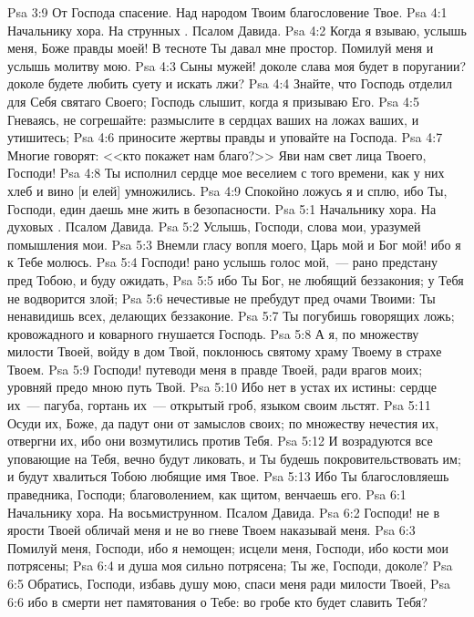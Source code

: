 \vs Psa 3:9 От Господа спасение. Над народом Твоим благословение Твое.
\vs Psa 4:1 Начальнику хора. На струнных . Псалом Давида.
\rsbpar\vs Psa 4:2 Когда я взываю, услышь меня, Боже правды моей! В тесноте Ты давал мне простор. Помилуй меня и услышь молитву мою.
\vs Psa 4:3 Сыны мужей! доколе слава моя будет в поругании? доколе будете любить суету и искать лжи?
\vs Psa 4:4 Знайте, что Господь отделил для Себя святаго Своего; Господь слышит, когда я призываю Его.
\vs Psa 4:5 Гневаясь, не согрешайте: размыслите в сердцах ваших на ложах ваших, и утишитесь;
\vs Psa 4:6 приносите жертвы правды и уповайте на Господа.
\vs Psa 4:7 Многие говорят: <<кто покажет нам благо?>> Яви нам свет лица Твоего, Господи!
\vs Psa 4:8 Ты исполнил сердце мое веселием с того времени, как у них хлеб и вино [и елей] умножились.
\vs Psa 4:9 Спокойно ложусь я и сплю, ибо Ты, Господи, един даешь мне жить в безопасности.
\vs Psa 5:1 Начальнику хора. На духовых . Псалом Давида.
\rsbpar\vs Psa 5:2 Услышь, Господи, слова мои, уразумей помышления мои.
\vs Psa 5:3 Внемли гласу вопля моего, Царь мой и Бог мой! ибо я к Тебе молюсь.
\vs Psa 5:4 Господи! рано услышь голос мой,~--- рано предстану пред Тобою, и буду ожидать,
\vs Psa 5:5 ибо Ты Бог, не любящий беззакония; у Тебя не водворится злой;
\vs Psa 5:6 нечестивые не пребудут пред очами Твоими: Ты ненавидишь всех, делающих беззаконие.
\vs Psa 5:7 Ты погубишь говорящих ложь; кровожадного и коварного гнушается Господь.
\vs Psa 5:8 А я, по множеству милости Твоей, войду в дом Твой, поклонюсь святому храму Твоему в страхе Твоем.
\vs Psa 5:9 Господи! путеводи меня в правде Твоей, ради врагов моих; уровняй предо мною путь Твой.
\vs Psa 5:10 Ибо нет в устах их истины: сердце их~--- пагуба, гортань их~--- открытый гроб, языком своим льстят.
\vs Psa 5:11 Осуди их, Боже, да падут они от замыслов своих; по множеству нечестия их, отвергни их, ибо они возмутились против Тебя.
\vs Psa 5:12 И возрадуются все уповающие на Тебя, вечно будут ликовать, и Ты будешь покровительствовать им; и будут хвалиться Тобою любящие имя Твое.
\vs Psa 5:13 Ибо Ты благословляешь праведника, Господи; благоволением, как щитом, венчаешь его.
\vs Psa 6:1 Начальнику хора. На восьмиструнном. Псалом Давида.
\rsbpar\vs Psa 6:2 Господи! не в ярости Твоей обличай меня и не во гневе Твоем наказывай меня.
\vs Psa 6:3 Помилуй меня, Господи, ибо я немощен; исцели меня, Господи, ибо кости мои потрясены;
\vs Psa 6:4 и душа моя сильно потрясена; Ты же, Господи, доколе?
\vs Psa 6:5 Обратись, Господи, избавь душу мою, спаси меня ради милости Твоей,
\vs Psa 6:6 ибо в смерти нет памятования о Тебе: во гробе кто будет славить Тебя?
